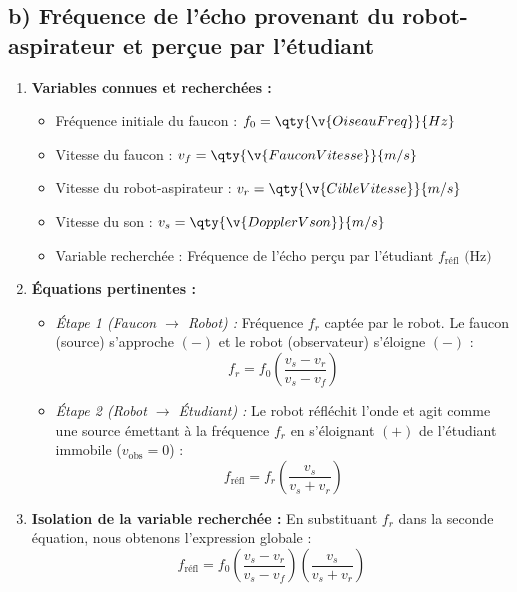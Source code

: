 \subsection*{b) Fréquence de l'écho provenant du robot-aspirateur et perçue par l'étudiant}

\begin{enumerate}[label=\arabic*)]
    \item \textbf{Variables connues et recherchées :}
    \begin{itemize}[label=$\bullet$]
        \item Fréquence initiale du faucon : $f_0 = \qty{\v{OiseauFreq}}{Hz}$
        \item Vitesse du faucon : $v_f = \qty{\v{FauconVitesse}}{m/s}$
        \item Vitesse du robot-aspirateur : $v_r = \qty{\v{CibleVitesse}}{m/s}$
        \item Vitesse du son : $v_s = \qty{\v{DopplerVson}}{m/s}$
        \item Variable recherchée : Fréquence de l'écho perçu par l'étudiant $f_{\text{réfl}} \text{ (Hz)}$
    \end{itemize}

    \item \textbf{Équations pertinentes :}
    \begin{itemize}[label=-]
        \item \textit{Étape 1 (Faucon $\rightarrow$ Robot) :} Fréquence $f_r$ captée par le robot. Le faucon (source) s'approche $(-)$ et le robot (observateur) s'éloigne $(-)$ :
        \[
        f_r = f_0 \left( \frac{v_s - v_r}{v_s - v_f} \right)
        \]
        \item \textit{Étape 2 (Robot $\rightarrow$ Étudiant) :} Le robot réfléchit l'onde et agit comme une source émettant à la fréquence $f_r$ en s'éloignant $(+)$ de l'étudiant immobile ($v_{\text{obs}} = 0$) :
        \[
        f_{\text{réfl}} = f_r \left( \frac{v_s}{v_s + v_r} \right)
        \]
    \end{itemize}

    \item \textbf{Isolation de la variable recherchée :}
    En substituant $f_r$ dans la seconde équation, nous obtenons l'expression globale :
    \[
    f_{\text{réfl}} = f_0 \left( \frac{v_s - v_r}{v_s - v_f} \right) \left( \frac{v_s}{v_s + v_r} \right)
    \]


\end{enumerate}
